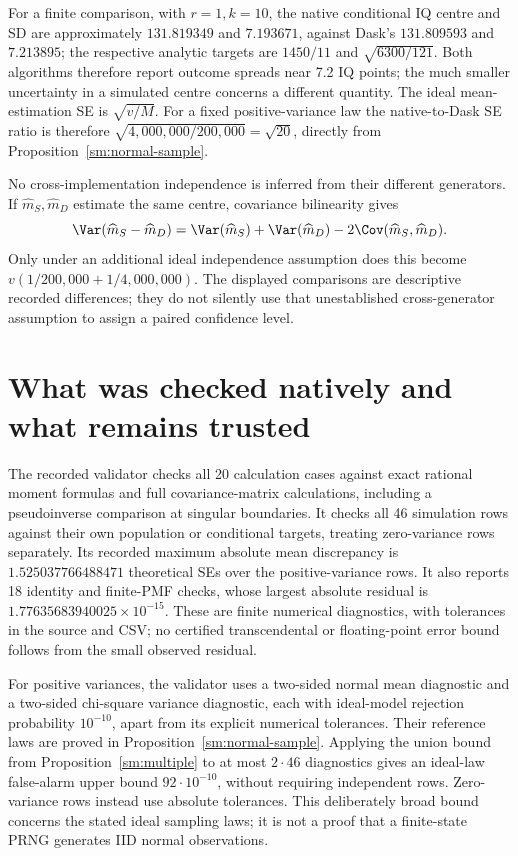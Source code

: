 For a finite comparison, with \(r=1,k=10\), the native conditional
IQ centre and SD are approximately \(131.819349\) and \(7.193671\),
against Dask's \(131.809593\) and \(7.213895\); the respective
analytic targets are \(1450/11\) and \(\sqrt{6300/121}\).
Both algorithms therefore report outcome spreads near 7.2 IQ points;
the much smaller uncertainty in a simulated centre concerns a different
quantity. The ideal mean-estimation SE is \(\sqrt{v/M}\). For a
fixed positive-variance law the native-to-Dask SE ratio is therefore
\(\sqrt{4{,}000{,}000/200{,}000}=\sqrt{20}\), directly from
Proposition~\ref{sm:normal-sample}.

No cross-implementation independence is inferred from their different
generators. If \(\widehat m_S,\widehat m_D\) estimate the same centre,
covariance bilinearity gives
\[
 \Var(\widehat m_S-\widehat m_D)
 =\Var(\widehat m_S)+\Var(\widehat m_D)
  -2\Cov(\widehat m_S,\widehat m_D).
\]
Only under an additional ideal independence assumption does this become
\(v(1/200{,}000+1/4{,}000{,}000)\). The displayed comparisons are
descriptive recorded differences; they do not silently use that
unestablished cross-generator assumption to assign a paired confidence
level.

\section{What was checked natively and what remains trusted}
The recorded validator checks all 20 calculation cases against exact
rational moment formulas and full covariance-matrix calculations,
including a pseudoinverse comparison at singular boundaries. It checks
all 46 simulation rows against their own population or conditional
targets, treating zero-variance rows separately. Its recorded maximum
absolute mean discrepancy is \(1.525037766488471\) theoretical SEs
over the positive-variance rows. It also reports 18 identity and finite-PMF
checks, whose largest absolute residual is
\(1.77635683940025\times10^{-15}\). These are finite numerical
diagnostics, with tolerances in the source and CSV; no certified
transcendental or floating-point error bound follows from the small
observed residual.

For positive variances, the validator uses a two-sided normal mean
diagnostic and a two-sided chi-square variance diagnostic, each with
ideal-model rejection probability \(10^{-10}\), apart from its explicit
numerical tolerances. Their reference laws are proved in
Proposition~\ref{sm:normal-sample}. Applying the union bound from
Proposition~\ref{sm:multiple} to at most \(2\cdot46\) diagnostics
gives an ideal-law false-alarm upper bound \(92\cdot10^{-10}\),
without requiring independent rows. Zero-variance rows instead use
absolute tolerances. This deliberately broad bound concerns the stated
ideal sampling laws; it is not a proof that a finite-state PRNG generates
IID normal observations.

